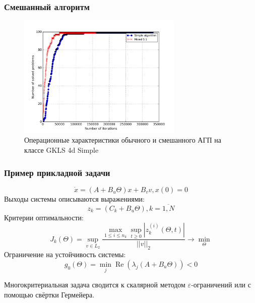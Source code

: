 \documentclass[aspectratio=1610]{beamer}
\DeclareMathOperator{\re}{Re}
\begin{document}
\begin{frame}
  \frametitle{Смешанный алгоритм}
  \begin{figure}
    \center
      \includegraphics[width=0.7\textwidth]{mixed_op4d.png}
      \caption*{Операционные характеристики обычного и смешанного АГП на классе GKLS 4d Simple}
  \end{figure}
\end{frame}

\begin{frame}
  \frametitle{Пример прикладной задачи}

    \begin{displaymath}
      \dot x = (A+B_u\Theta)x + B_v v, x(0)=0
    \end{displaymath}
    Выходы системы описываются выражениями:
    \begin{displaymath}
      z_k=(C_k+B_u\Theta),k=\overline{1,N}
    \end{displaymath}
    Критерии оптимальности:
    \begin{displaymath}
      J_k(\Theta)=\sup_{v\in L_2} \frac{\max_{1\leqslant i \leqslant n_k} \sup_{t\geqslant 0}|z_k^{(i)}(\Theta,t)|}{||v||_2} \rightarrow\min_{\Theta}
    \end{displaymath}
    Ограничение на устойчивость системы:
    \begin{displaymath}
      g_0(\Theta)=\min_{j}\re(\lambda_j(A+B_u\Theta)) < 0
    \end{displaymath}

    Многокритериальная задача сводится к скалярной методом \(\varepsilon\)-ограничений или с помощью свёртки Гермейера.

\end{frame}
\end{document}

